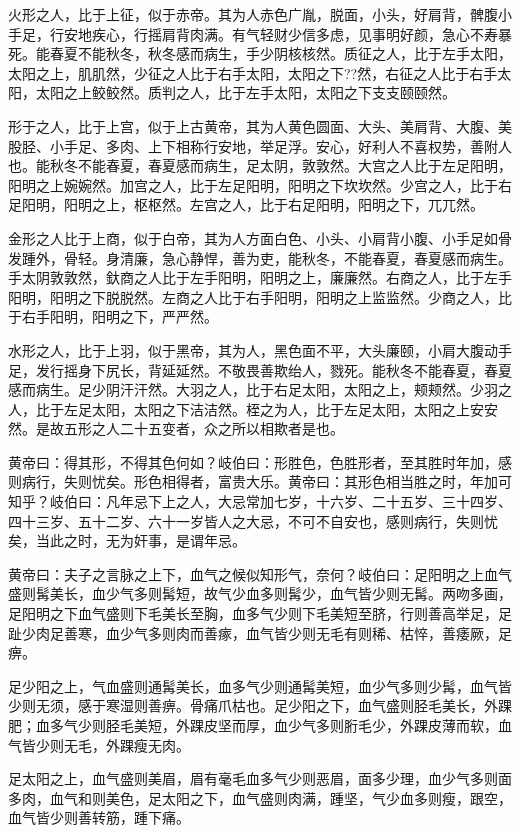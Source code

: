 \documentclass[a4paper,12pt,UTF8,twoside]{ctexbook}
\begin{document}
	火形之人，比于上征，似于赤帝。其为人赤色广胤，脱面，小头，好肩背，髀腹小手足，行安地疾心，行摇肩背肉满。有气轻财少信多虑，见事明好颜，急心不寿暴死。能春夏不能秋冬，秋冬感而病生，手少阴核核然。质征之人，比于左手太阳，太阳之上，肌肌然，少征之人比于右手太阳，太阳之下??然，右征之人比于右手太阳，太阳之上鲛鲛然。质判之人，比于左手太阳，太阳之下支支颐颐然。
	
	形于之人，比于上宫，似于上古黄帝，其为人黄色圆面、大头、美肩背、大腹、美股胫、小手足、多肉、上下相称行安地，举足浮。安心，好利人不喜权势，善附人也。能秋冬不能春夏，春夏感而病生，足太阴，敦敦然。大宫之人比于左足阳明，阳明之上婉婉然。加宫之人，比于左足阳明，阳明之下坎坎然。少宫之人，比于右足阳明，阳明之上，枢枢然。左宫之人，比于右足阳明，阳明之下，兀兀然。
	
	金形之人比于上商，似于白帝，其为人方面白色、小头、小肩背小腹、小手足如骨发踵外，骨轻。身清廉，急心静悍，善为吏，能秋冬，不能春夏，春夏感而病生。手太阴敦敦然，釱商之人比于左手阳明，阳明之上，廉廉然。右商之人，比于左手阳明，阳明之下脱脱然。左商之人比于右手阳明，阳明之上监监然。少商之人，比于右手阳明，阳明之下，严严然。
	
	水形之人，比于上羽，似于黑帝，其为人，黑色面不平，大头廉颐，小肩大腹动手足，发行摇身下尻长，背延延然。不敬畏善欺绐人，戮死。能秋冬不能春夏，春夏感而病生。足少阴汗汗然。大羽之人，比于右足太阳，太阳之上，颊颊然。少羽之人，比于左足太阳，太阳之下洁洁然。桎之为人，比于左足太阳，太阳之上安安然。是故五形之人二十五变者，众之所以相欺者是也。
	
	黄帝曰：得其形，不得其色何如？岐伯曰：形胜色，色胜形者，至其胜时年加，感则病行，失则忧矣。形色相得者，富贵大乐。黄帝曰：其形色相当胜之时，年加可知乎？岐伯曰：凡年忌下上之人，大忌常加七岁，十六岁、二十五岁、三十四岁、四十三岁、五十二岁、六十一岁皆人之大忌，不可不自安也，感则病行，失则忧矣，当此之时，无为奸事，是谓年忌。
	
	黄帝曰：夫子之言脉之上下，血气之候似知形气，奈何？岐伯曰：足阳明之上血气盛则髯美长，血少气多则髯短，故气少血多则髯少，血气皆少则无髯。两吻多画，足阳明之下血气盛则下毛美长至胸，血多气少则下毛美短至脐，行则善高举足，足趾少肉足善寒，血少气多则肉而善瘃，血气皆少则无毛有则稀、枯悴，善痿厥，足痹。
	
	足少阳之上，气血盛则通髯美长，血多气少则通髯美短，血少气多则少髯，血气皆少则无须，感于寒湿则善痹。骨痛爪枯也。足少阳之下，血气盛则胫毛美长，外踝肥；血多气少则胫毛美短，外踝皮坚而厚，血少气多则胻毛少，外踝皮薄而软，血气皆少则无毛，外踝瘦无肉。
	
	足太阳之上，血气盛则美眉，眉有毫毛血多气少则恶眉，面多少理，血少气多则面多肉，血气和则美色，足太阳之下，血气盛则肉满，踵坚，气少血多则瘦，跟空，血气皆少则善转筋，踵下痛。
	
\end{document}
